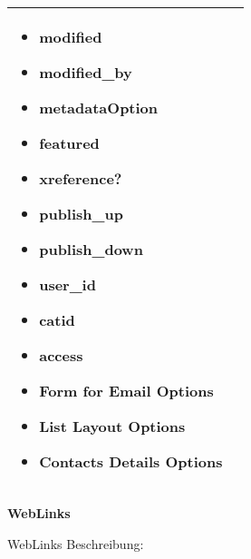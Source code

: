 \begin{minipage}{0.7\textwidth}
\begin{tabular}{|p{} | p{}|}
\begin{itemize}
\item  modified
\item  modified\_by
\item  metadataOption
\item  featured
\item  xreference?
\item  publish\_up
\item  publish\_down
\item  user\_id
\item  catid
\item  access
\item  Form for Email Options
\item  List Layout Options
\item Contacts Details Options
\end{itemize}
\\
\hline
\end{tabular}
\end{minipage}


\textbf{WebLinks}

WebLinks Beschreibung:

